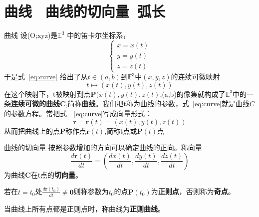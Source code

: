 
\section{曲线 \ 曲线的切向量\ 弧长}
\begin{mydefinition}{曲线}
	设(O;xyz)是$\mathbb{E}^3$ 中的笛卡尔坐标系，
	\begin{equation}
		\label{eq:curve}
		\begin{cases}
			x=x(t)\\
			y=y(t)\\
			z=z(t)
		\end{cases}
	\end{equation}
	于是式~\eqref{eq:curve} 给出了从$t\in(a,b)$到$\mathbb{E}^3$中$(x,y,z)$的连续可微映射
	\begin{equation}
		\label{eq:curve-map}
		t \mapsto (x(t),y(t),z(t))
	\end{equation}
	在这个映射下，t被映射到点$\mathbf{P}(x(t),y(t),z(t)$,(a,b)的像集就构成了$\mathbb{E}^3$中的一条\textbf{连续可微的曲线}$\mathbf{C}$,简称\textbf{曲线}。我们把t称为曲线的参数，式~\eqref{eq:curve}就是曲线$C$的参数方程。常把式~~\eqref{eq:curve}写成向量形式：
	\begin{equation}
		\label{eq:curve-vector}
		\mathbf{r}=\mathbf{r}(t)=(x(t),y(t),z(t))
	\end{equation}
	从而把曲线上的点$\mathbf{P}$称作点$\mathbf{r}(t)$,简称t点或$\mathbf{P}(t)$点
\end{mydefinition}
\begin{mydefinition}{曲线的切向量}
	按照参数增加的方向可以确定曲线的正向。称向量
	\begin{equation}
		\label{eq:tangent-vector}
		\frac{d\mathbf{r}(t)}{dt}=(\frac{dx(t)}{dt},\frac{dy(t)}{dt},\frac{dz(t)}{dt})
	\end{equation}
	为曲线$\mathbf{C}$在t点的\textbf{切向量}。

	若在$t=t_0$处$\frac{d\mathbf{r}(t_0)}{dt}\neq \mathbf{0}$则称参数为$t_0$的点$\mathbf{P}(t_0)$为\textbf{正则点}，否则称为\textbf{奇点}。

	当曲线上所有点都是正则点时，称曲线为\textbf{正则曲线}。
\end{mydefinition}

